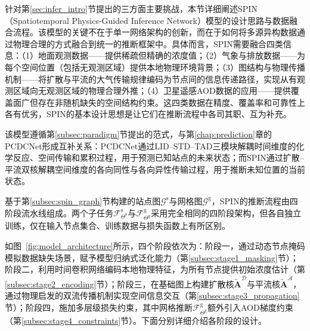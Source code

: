 针对第\ref{sec:infer_intro}节提出的三方面主要挑战，本节详细阐述SPIN（Spatiotemporal Physics-Guided Inference Network）模型的设计思路与数据融合流程。该模型的关键不在于单一网络架构的创新，而在于如何将多源异构数据通过物理合理的方式融合到统一的推断框架中。具体而言，SPIN需要融合四类信息：（1）地面观测数据——提供稀疏但精确的浓度值；（2）气象与排放数据——为每个空间位置（包括无观测区域）提供本地物理环境背景；（3）图结构与物理传播机制——将扩散与平流的大气传输规律编码为节点间的信息传递路径，实现从有观测区域向无观测区域的物理合理外推；（4）卫星遥感AOD数据的应用——提供覆盖面广但存在非随机缺失的空间结构约束。这四类数据在精度、覆盖率和可靠性上各有优劣，SPIN的基本设计思想是让它们在推断流程中各司其职、互为补充。

该模型遵循第\ref{subsec:paradigm}节提出的范式，与第\ref{chap:prediction}章的PCDCNet形成互补关系：PCDCNet通过LID--STD--TAD三模块解耦时间维度的化学反应、空间传输和累积过程，用于预测已知站点的未来状态；而SPIN通过扩散--平流双核解耦空间维度的各向同性与各向异性传输过程，用于推断未知位置的当前状态。

基于第\ref{subsec:spin_graph}节构建的站点图$\mathcal{G}^{\text{s}}$与网格图$\mathcal{G}^{\text{g}}$，SPIN的推断流程由四阶段流水线组成。两个子任务$\mathcal{F}^{\text{s}}_{\Theta^{\text{s}}}$与$\mathcal{F}^{\text{g}}_{\Theta^{\text{g}}}$采用完全相同的四阶段架构，但各自独立训练，仅在输入节点集合、训练数据与损失函数上有所区别。

如图~\ref{fig:model_architecture}所示，四个阶段依次为：阶段一，通过动态节点掩码模拟数据缺失场景，赋予模型归纳式泛化能力（第\ref{subsec:stage1_masking}节）；阶段二，利用时间卷积网络编码本地物理特征，为所有节点提供初始浓度估计（第\ref{subsec:stage2_encoding}节）；阶段三，在基础图上构建扩散核$\tilde{\mathbf{A}}^{\mathcal{D}}$与平流核$\tilde{\mathbf{A}}^{\mathcal{A}}$，通过物理启发的双流传播机制实现空间信息交互（第\ref{subsec:stage3_propagation}节）；阶段四，施加多层级损失约束，其中网格推断$\mathcal{F}^{\text{g}}_{\Theta^{\text{g}}}$额外引入AOD梯度约束（第\ref{subsec:stage4_constraints}节）。下面分别详细介绍各阶段的设计。

